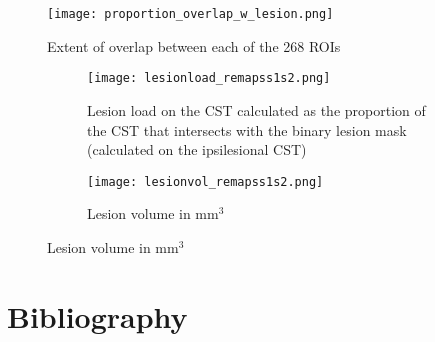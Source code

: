 \documentclass[10pt]{article}
\begin{document}
	\begin{figure}[h]
	\texttt{[image: proportion\_overlap\_w\_lesion.png]}
	\caption{Extent of overlap between each of the 268 ROIs}	\centering
	\end{figure}

	\begin{figure}[h]
		\begin{subfigure}{.5\textwidth}
		\texttt{[image: lesionload\_remapss1s2.png]}
		\caption{Lesion load on the CST calculated as the proportion of the CST that intersects with the binary lesion mask (calculated on the ipsilesional CST)}
		\centering
		\end{subfigure}
		\begin{subfigure}{.5\textwidth}
		\texttt{[image: lesionvol\_remapss1s2.png]}
		\caption{Lesion volume in mm$^{3}$}
		\centering
		\end{subfigure}
	\label{fig:fig}
	\end{figure}
	\section*{Bibliography}

	\printbibliography

	
\end{document}
